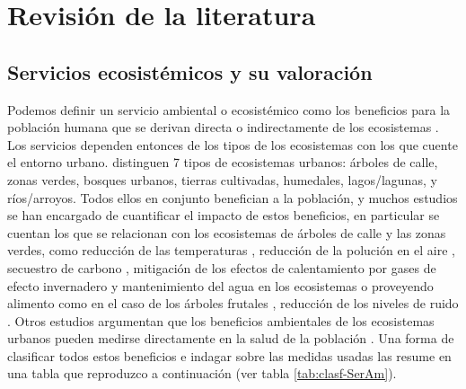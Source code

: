 \documentclass[12pt,]{book}
\begin{document}
\chapter{Revisión de la literatura}\label{revlit}

\section{Servicios ecosistémicos y su
valoración}\label{servicios-ecosistemicos-y-su-valoracion}

Podemos definir un servicio ambiental o ecosistémico como los beneficios
para la población humana que se derivan directa o indirectamente de los
ecosistemas \citep{bolund_ecosystem_1999}. Los servicios dependen
entonces de los tipos de los ecosistemas con los que cuente el entorno
urbano. \citet{bolund_ecosystem_1999} distinguen 7 tipos de ecosistemas
urbanos: árboles de calle, zonas verdes, bosques urbanos, tierras
cultivadas, humedales, lagos/lagunas, y ríos/arroyos. Todos ellos en
conjunto benefician a la población, y muchos estudios se han encargado
de cuantificar el impacto de estos beneficios, en particular se cuentan
los que se relacionan con los ecosistemas de árboles de calle y las
zonas verdes, como reducción de las temperaturas
\citep{ripoll_condiciones_2010}, reducción de la polución en el aire
\citep{duran_rivera_intercepcion_2009}, secuestro de carbono
\citep{nowak_carbon_2002, mcpherson2013new} , mitigación de los efectos
de calentamiento por gases de efecto invernadero
\citep{laredo_gestion_2011} y mantenimiento del agua en los ecosistemas
o proveyendo alimento como en el caso de los árboles frutales
\citep{konijnendijk_arboles_2005, nolazco_diversidad_2012}, reducción de
los niveles de ruido \citep{bolund_ecosystem_1999}. Otros estudios
argumentan que los beneficios ambientales de los ecosistemas urbanos
pueden medirse directamente en la salud de la población
\citep{bolund_ecosystem_1999, gomez-baggethun_classifying_2013}. Una
forma de clasificar todos estos beneficios e indagar sobre las medidas
usadas las resume \citet{gomez-baggethun_classifying_2013} en una tabla
que reproduzco a continuación (ver tabla \ref{tab:clasf-SerAm}).
\end{document}
